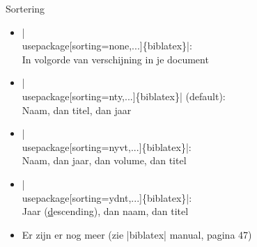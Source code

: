 
\begin{frame}{Sortering}
	\begin{itemize}
		\item \hll|\\usepackage[sorting=none,...]\{biblatex\}|: \\
		In volgorde van verschijning in je document

		\item \hll|\\usepackage[sorting=nty,...]\{biblatex\}| (default):\\
		Naam, dan titel, dan jaar

		\item \hll|\\usepackage[sorting=nyvt,...]\{biblatex\}|:\\
		Naam, dan jaar, dan volume, dan titel

		\item \hll|\\usepackage[sorting=ydnt,...]\{biblatex\}|:\\
		Jaar (\underline{d}escending), dan naam, dan titel

		\item Er zijn er nog meer (zie \hll|biblatex| manual, pagina 47)
	\end{itemize}
\end{frame}
